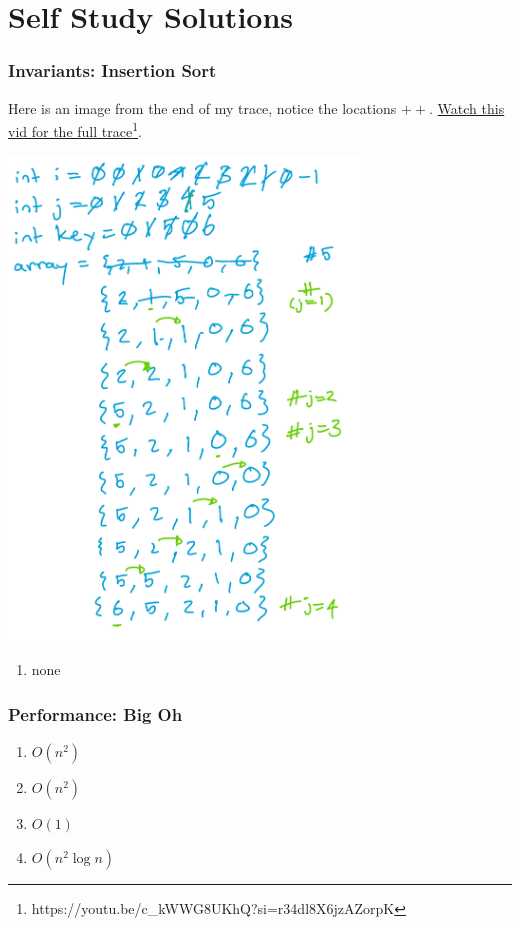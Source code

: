 \documentclass[twoside=false,DIV=14]{scrartcl}
\begin{document}
\newpage\setcounter{section}{0}
\part*{Self Study Solutions}
\section{Invariants: Insertion Sort}

Here is an image from the end of my trace, notice the locations $++$.  \href{https://youtu.be/c_kWWG8UKhQ?si=r34dl8X6jzAZorpK}{Watch this vid for the full trace\footnote{\url{https://youtu.be/c_kWWG8UKhQ?si=r34dl8X6jzAZorpK}}}.

\includegraphics[width=0.7\textwidth]{./insertion_trace.jpeg}

\begin{enumerate}
\item none
\end{enumerate}

\section{Performance: Big Oh}
\begin{enumerate}
\item $O(n^2)$
\item $O(n^2)$

\item $O(1)$

\item $O(n^2\log n)$
\end{enumerate}
\end{document}
